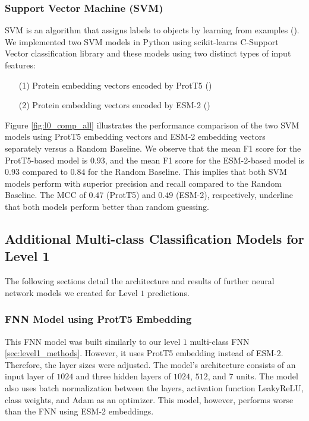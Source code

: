 \documentclass{bioinfo}
\begin{document}


\subsubsection{Support Vector Machine (SVM)}
SVM is an algorithm that assigns labels to objects by learning from examples (\cite{svm}).
We implemented two SVM models in Python using scikit-learns C-Support Vector classification library and these models using two distinct types of 
input features: 
\begin{enumerate}
	\item[(1)] Protein embedding vectors encoded by ProtT5 (\cite{ProtT5})
	\item[(2)] Protein embedding vectors encoded by ESM-2 (\cite{ESM2})
\end{enumerate}

Figure \ref{fig:l0_comp_all} illustrates the performance comparison of the two SVM models using ProtT5 embedding vectors and ESM-2 embedding vectors separately versus a Random Baseline. 
We observe that the mean F1 score for the ProtT5-based model is $0.93$, and the mean F1 score for the ESM-2-based model is $0.93$ compared to $0.84$ for the Random Baseline. This implies that both SVM models perform 
with superior precision and recall compared to the Random Baseline. The MCC of $0.47$ (ProtT5) and $0.49$ (ESM-2),
respectively, underline that both models perform better than random guessing.


\subsection{Additional Multi-class Classification Models for Level 1}
The following sections detail the architecture and results of further neural network models we created for Level $1$ predictions.

\subsubsection{FNN Model using ProtT5 Embedding}
This FNN model was built similarly to our level $1$ multi-class FNN \ref{sec:level1_methods}. 
However, it uses ProtT5 embedding instead of ESM-2. 
Therefore, the layer sizes were adjusted. 
The model's architecture consists of an input layer of $1024$ and three hidden layers of $1024$, $512$, and $7$ units. 
The model also uses batch normalization between the layers, activation function LeakyReLU, class weights, and Adam as an optimizer.
This model, however, performs worse than the FNN using ESM-2 embeddings.
\end{document}
